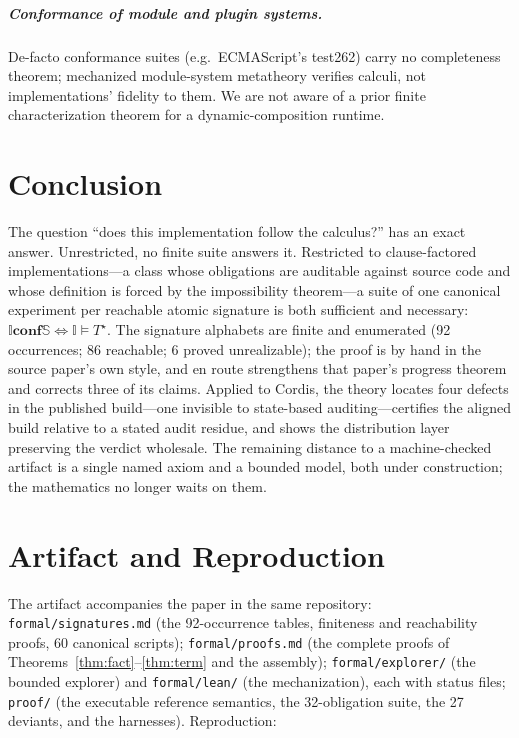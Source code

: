 \documentclass[sigplan,screen,review,nonacm]{acmart}
\newcommand{\Spec}{\ensuremath{\mathbb S}}
\newcommand{\Impl}{\ensuremath{\mathbb I}}
\newcommand{\conf}{\mathrel{\mathbf{conf}}}
\newcommand{\Tstar}{\ensuremath{T^{\star}}}
\begin{document}
\subparagraph{Conformance of module and plugin systems.} De-facto conformance
suites (e.g.\ ECMAScript's test262) carry no completeness theorem; mechanized
module-system metatheory verifies calculi, not implementations' fidelity to
them. We are not aware of a prior finite characterization theorem for a
dynamic-composition runtime.

\section{Conclusion}\label{sec:conclusion}

The question ``does this implementation follow the calculus?'' has an exact
answer. Unrestricted, no finite suite answers it. Restricted to
clause-factored implementations---a class whose obligations are auditable
against source code and whose definition is forced by the impossibility
theorem---a suite of one canonical experiment per reachable atomic signature
is both sufficient and necessary:
$\Impl \conf \Spec \iff \Impl \models \Tstar$. The signature alphabets are
finite and enumerated (92 occurrences; 86 reachable; 6 proved unrealizable);
the proof is by hand in the source paper's own style, and en route strengthens
that paper's progress theorem and corrects three of its claims. Applied to
Cordis, the theory locates four defects in the published build---one invisible
to state-based auditing---certifies the aligned build relative to a stated
audit residue, and shows the distribution layer preserving the verdict
wholesale. The remaining distance to a machine-checked artifact is a single
named axiom and a bounded model, both under construction; the mathematics no
longer waits on them.

\appendix

\section{Artifact and Reproduction}\label{app:artifact}

The artifact accompanies the paper in the same repository:
\texttt{formal/signatures.md} (the 92-occurrence tables, finiteness and
reachability proofs, 60 canonical scripts);
\texttt{formal/proofs.md} (the complete proofs of
Theorems~\ref{thm:fact}--\ref{thm:term} and the assembly);
\texttt{formal/explorer/} (the bounded explorer) and
\texttt{formal/lean/} (the mechanization), each with status files;
\texttt{proof/} (the executable reference semantics, the 32-obligation suite,
the 27 deviants, and the harnesses). Reproduction:
\end{document}
